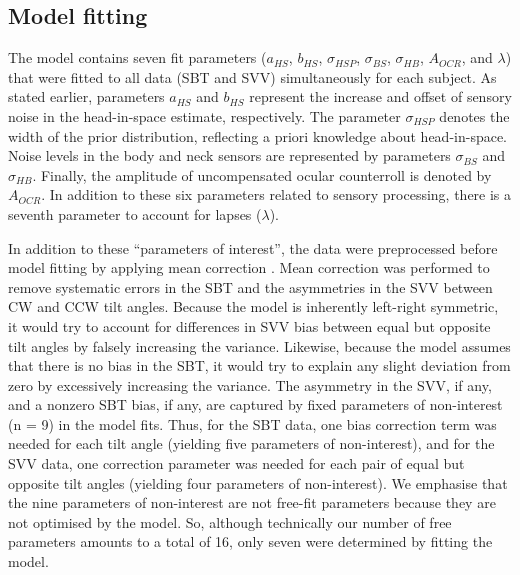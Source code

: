 \subsection{Model fitting}

The model contains seven fit parameters ($a_{HS}$, $b_{HS}$, $\sigma_{HSP}$, $\sigma_{BS}$, $\sigma_{HB}$, $A_{OCR}$, and $\lambda$) that were fitted to all data (SBT and SVV) simultaneously for each subject. As stated earlier, parameters $a_{HS}$ and $b_{HS}$ represent the increase and offset of sensory noise in the head-in-space estimate, respectively. The parameter $\sigma_{HSP}$ denotes the width of the prior distribution, reflecting a priori knowledge about head-in-space. Noise levels in the body and neck sensors are represented by parameters $\sigma_{BS}$ and $\sigma_{HB}$. Finally, the amplitude of uncompensated ocular counterroll is denoted by $A_{OCR}$. In addition to these six parameters related to sensory processing, there is a seventh parameter to account for lapses ($\lambda$). 

In addition to these ``parameters of interest'', the data were preprocessed before model fitting by applying mean correction \cite{mcguire2009}. Mean correction was performed to remove systematic errors in the SBT and the asymmetries in the SVV between CW and CCW tilt angles. Because the model is inherently left-right symmetric, it would try to account for differences in SVV bias between equal but opposite tilt angles by falsely increasing the variance. Likewise, because the model assumes that there is no bias in the SBT, it would try to explain any slight deviation from zero by excessively increasing the variance. The asymmetry in the SVV, if any, and a nonzero SBT bias, if any, are captured by fixed parameters of non-interest (n = 9) in the model fits. Thus, for the SBT data, one bias correction term was needed for each tilt angle (yielding five parameters of non-interest), and for the SVV data, one correction parameter was needed for each pair of equal but opposite tilt angles (yielding four parameters of non-interest). We emphasise that the nine parameters of non-interest are not free-fit parameters because they are not optimised by the model. So, although technically our number of free parameters amounts to a total of 16, only seven were determined by fitting the model. 

